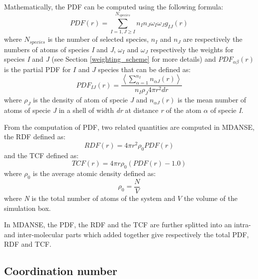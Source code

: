 \documentclass[a4paper,11pt]{article}
\begin{document}
Mathematically, the \gls{PDF} can be computed using the following formula:
\begin{equation}
PDF(r)=\sum_{I = 1,J\geq I}^{N_{species}}n_In_J \omega_I \omega_J g_{IJ}(r)
\end{equation}
where $N_{species}$ is the number of selected species, $n_I$ and $n_J$ are respectively the numbers of atoms of species 
\textit{I} and \textit{J}, $\omega_I$ and $\omega_J$ respectively the weights for species \textit{I} and \textit{J} 
(see Section \ref{weighting_scheme} for more details) and $PDF_{\alpha\beta}(r)$ is the partial \gls{PDF} for $I$ 
and $J$ species that can be defined as:
\begin{equation}
\label{eq:gij}
PDF_{IJ}(r) = \frac{\left\langle\sum_{\alpha = 1}^{n_I} n_{\alpha J}(r)\right\rangle}{n_I\rho_J 4\pi r^2dr}
\end{equation}
where $\rho_J$ is the density of atom of specie \textit{J} and $n_{\alpha J}(r)$ is the mean number of atoms of specie 
\textit{J} in a shell of width \textit{dr} at distance \textit{r} of the atom $\alpha$ of specie \textit{I}.

From the computation of \gls{PDF}, two related quantities are computed in \gls{MDANSE}, the \gls{RDF} defined as:
\begin{equation}
RDF(r) = 4 \pi r^2 \rho_0 PDF(r)
\end{equation}
and the \gls{TCF} defined as:
\begin{equation}
TCF(r) = 4\pi r \rho_0 (PDF(r) - 1.0)
\end{equation}
where $\rho_0$ is the average atomic density defined as:
\begin{equation}
\rho_0 = \frac{N}{V}
\end{equation}
where \textit{N} is the total number of atoms of the system and $V$ the volume of the simulation box.

In \gls{MDANSE}, the \gls{PDF}, the \gls{RDF} and the \gls{TCF} are further splitted into an intra-and inter-molecular parts 
which added together give respectively the total \gls{PDF}, \gls{RDF} and \gls{TCF}.

\subsection{Coordination number}
\label{cn}
\end{document}
